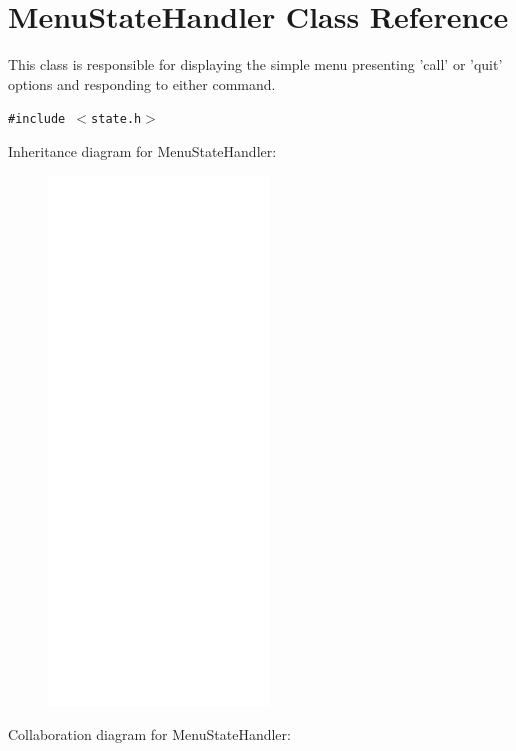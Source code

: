 \hypertarget{classMenuStateHandler}{
\section{MenuStateHandler Class Reference}
\label{classMenuStateHandler}
}
This class is responsible for displaying the simple menu presenting 'call' or 'quit' options and responding to either command.  


{\tt \#include $<$state.h$>$}

Inheritance diagram for MenuStateHandler:\nopagebreak
\begin{figure}[H]
\begin{center}
\leavevmode
\includegraphics[width=166pt]{classMenuStateHandler__inherit__graph}
\end{center}
\end{figure}
Collaboration diagram for MenuStateHandler:\nopagebreak
